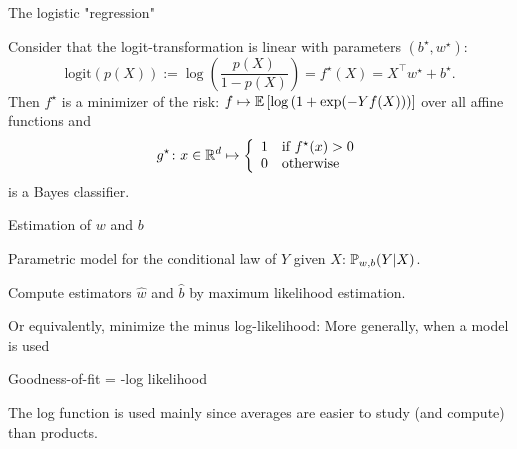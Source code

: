 \documentclass[xcolor={usenames,dvipsnames},handout]{beamer}
\begin{document}
\begin{frame}{The logistic "regression"}
\begin{theorem}
	Consider that the logit-transformation is linear with parameters $(b^\star, w^\star)$:
$$
\mathrm{logit} (p(X)) := \log\left( \frac{p(X)}{1-p(X)} \right) = f^\star(X) =  X^\top w^\star + b^\star.
$$
	Then \alert{$f^\star$ is a minimizer of the risk}:
	$f \mapsto \E \left[\log\left( 1 + \exp(-Yf(X)) \right) \right]$ over all affine functions and
	$$
		g^\star \colon x \in \R^d \mapsto
		\left\{ \begin{array}{ll}
			1 & \text{if } f^\star(x) > 0 \\
			0 & \text{otherwise}
		\end{array} \right.
	$$
	is a Bayes classifier.
\end{theorem}
\end{frame}


\begin{frame}{Estimation of $w$ and $b$}

 \alert{Parametric model} for the conditional law of $Y$ given $X$: $\P_{w,b}(Y|X)$.

%

\vspace{.2cm}

Compute estimators $\hat{w}$ and $\hat{b}$ by maximum likelihood estimation.

\vspace{.2cm}

Or equivalently, \alert{minimize the minus log-likelihood}: 
More generally, when a model is used
\begin{center}
Goodness-of-fit = -log likelihood
\end{center}
The log function is used mainly since averages are easier to study (and compute) than products.
\end{frame}
\end{document}
